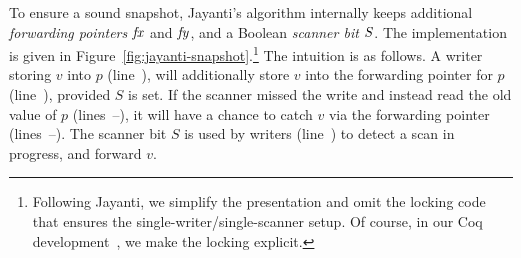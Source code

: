 \documentclass[a4paper,UKenglish]{lipics-v2016}
\theoremstyle{definition}
\begin{document}
To ensure a sound snapshot, Jayanti's algorithm internally keeps
additional \emph{forwarding pointers} $\mathit{fx}$ and $\mathit{fy}$, and a Boolean
\emph{scanner bit} $S$. The implementation is given in
Figure~\ref{fig:jayanti-snapshot}.\footnote{Following Jayanti, we
  simplify the presentation and omit the locking code that ensures the
  single-writer/single-scanner setup. Of course, in our Coq
  development~\cite{FCSL:Project}, we make the locking explicit.}
%
The intuition is as follows. A writer storing $v$ into $p$
(line~\lineWrtWrt), will additionally store $v$ into the forwarding
pointer for $p$ (line~\lineWrtFwd), provided $S$ is set. If the
scanner missed the write and instead read the old value of $p$
(lines~\lineScanReadsX--\lineScanReadsY), it will have a chance to
catch $v$ via the forwarding pointer
(lines~\lineScanReadsFX--\lineScanReadsFY). The scanner bit $S$ is
used by writers (line~\lineWrtChk) to detect a scan in progress, and
forward $v$.

%
\end{document}

